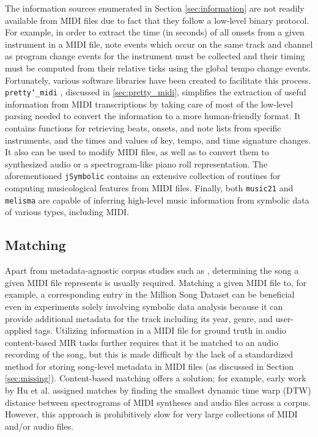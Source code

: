 The information sources enumerated in Section \ref{sec:information} are not readily available from MIDI files due to fact that they follow a low-level binary protocol.
For example, in order to extract the time (in seconds) of all onsets from a given instrument in a MIDI file, note events which occur on the same track and channel as program change events for the instrument must be collected and their timing must be computed from their relative ticks using the global tempo change events.
Fortunately, various software libraries have been created to facilitate this process.
\texttt{pretty\char`_midi} \cite{raffel2014pretty_midi}, discussed in \cref{sec:pretty_midi}, simplifies the extraction of useful information from MIDI transcriptions by taking care of most of the low-level parsing needed to convert the information to a more human-friendly format.
It contains functions for retrieving beats, onsets, and note lists from specific instruments, and the times and values of key, tempo, and time signature changes.
It also can be used to modify MIDI files, as well as to convert them to synthesized audio or a spectrogram-like piano roll representation.
The aforementioned \texttt{jSymbolic} contains an extensive collection of routines for computing musicological features from MIDI files.
Finally, both \texttt{music21} and \texttt{melisma} are capable of inferring high-level music information from symbolic data of various types, including MIDI.

\subsection{Matching}

Apart from metadata-agnostic corpus studies such as \cite{mauch2012corpus}, determining the song a given MIDI file represents is usually required.
Matching a given MIDI file to, for example, a corresponding entry in the Million Song Dataset \cite{bertin2011million} can be beneficial even in experiments solely involving symbolic data analysis because it can provide additional metadata for the track including its year, genre, and user-applied tags.
Utilizing information in a MIDI file for ground truth in audio content-based MIR tasks further requires that it be matched to an audio recording of the song, but this is made difficult by the lack of a standardized method for storing song-level metadata in MIDI files (as discussed in Section \ref{sec:missing}).
Content-based matching offers a solution; for example, early work by Hu et al. \cite{hu2003polyphonic} assigned matches by finding the smallest dynamic time warp (DTW) distance between spectrograms of MIDI syntheses and audio files across a corpus.
However, this approach is prohibitively slow for very large collections of MIDI and/or audio files.


